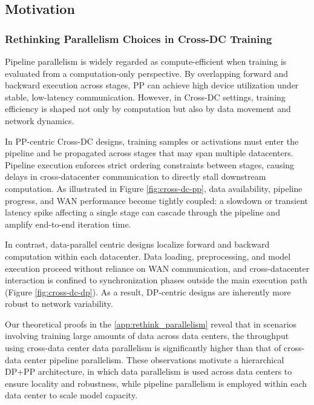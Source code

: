 \subsection{Motivation}

\subsubsection{Rethinking Parallelism Choices in Cross-DC Training}
\label{ssb:rethink_parallelism}
Pipeline parallelism is widely regarded as compute-efficient when training is evaluated from a computation-only perspective. By overlapping forward and backward execution across stages, PP can achieve high device utilization under stable, low-latency communication. However, in Cross-DC settings, training efficiency is shaped not only by computation but also by data movement and network dynamics.

In PP-centric Cross-DC designs, training samples or activations must enter the pipeline and be propagated across stages that may span multiple datacenters. Pipeline execution enforces strict ordering constraints between stages, causing delays in cross-datacenter communication to directly stall downstream computation. As illustrated in Figure \ref{fig:cross-dc-pp}, data availability, pipeline progress, and WAN performance become tightly coupled: a slowdown or transient latency spike affecting a single stage can cascade through the pipeline and amplify end-to-end iteration time.

In contrast, data-parallel centric designs localize forward and backward computation within each datacenter. Data loading, preprocessing, and model execution proceed without reliance on WAN communication, and cross-datacenter interaction is confined to synchronization phases outside the main execution path (Figure \ref{fig:cross-dc-dp}). As a result, DP-centric designs are inherently more robust to network variability. 

Our theoretical proofs in the \ref{app:rethink_parallelism} reveal that in scenarios involving training large amounts of data across data centers, the throughput using cross-data center data parallelism is significantly higher than that of cross-data center pipeline parallelism. These observations motivate a hierarchical DP+PP architecture, in which data parallelism is used across data centers to ensure locality and robustness, while pipeline parallelism is employed within each data center to scale model capacity\cite{DBLP:journals/pvldb/KloudasRPM15}.

